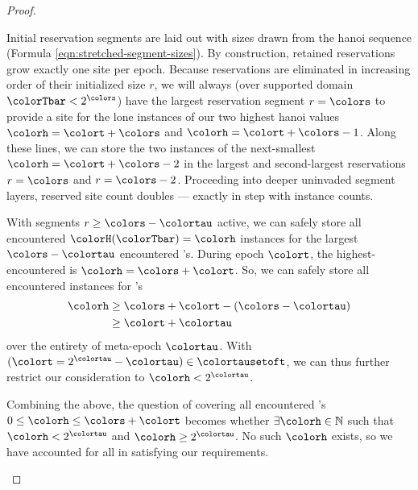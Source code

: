 \begin{proof}
\begin{proofpart}
Initial reservation segments are laid out with sizes drawn from the hanoi sequence (Formula \ref{eqn:stretched-segment-sizes}).
By construction, retained reservations grow exactly one site per epoch.
Because reservations are eliminated in increasing order of their initialized size $r$, we will always (over supported domain $\colorTbar < 2^{\colors}$) have the largest reservation segment $r=\colors$ to provide a site for the lone instances of our two highest hanoi values $\colorh=\colort+\colors$ and $\colorh=\colort+\colors-1$.
Along these lines, we can store the two instances of the next-smallest \hv{} $\colorh=\colort+\colors-2$ in the largest and second-largest reservations $r=\colors$ and $r=\colors-2$.
Proceeding into deeper uninvaded segment layers, reserved site count doubles --- exactly in step with \hv{} instance counts.

With segments $r \geq \colors - \colortau$ active, we can safely store all encountered \hv{} $\colorH(\colorTbar) = \colorh$ instances for the largest $\colors - \colortau$ encountered \hv's.
During epoch $\colort$, the highest-encountered \hv{} is $\colorh=\colors + \colort$.
So, we can safely store all encountered instances for \hv{}'s
\begin{align*}
\colorh
&\geq
\colors + \colort - (\colors - \colortau)\\
&\geq
\colort + \colortau
\end{align*}
over the entirety of meta-epoch $\colortau$.
With $(\colort = 2^{\colortau} - \colortau) \in \colortausetoft$, we can thus further restrict our consideration to $\colorh < 2^{\colortau}$.
\end{proofpart}

\begin{proofpart}
Combining the above, the question of covering all encountered \hv's $0\leq\colorh\leq\colors+\colort$ becomes whether $\exists \colorh \in \mathbb{N}$ such that $\colorh < 2^{\colortau}$ and $\colorh \geq 2^{\colortau}$.
No such $\colorh$ exists, so we have accounted for all \hv{} in satisfying our requirements.
\end{proofpart}

\end{proof}
